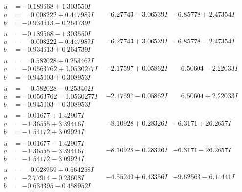 \documentclass[1p]{elsarticle_modified}
\theoremstyle{definition}
\begin{document}
$$\begin{array}{c|c|c}
\begin{aligned}
u &= -0.189668 + 1.303550 I \\
a &= \phantom{-}0.008222 + 0.447989 I \\
b &= -0.934613 - 0.264739 I\end{aligned}
 & -6.27743 - 3.06539 I & -6.85778 + 2.47354 I \\ \hline\begin{aligned}
u &= -0.189668 - 1.303550 I \\
a &= \phantom{-}0.008222 - 0.447989 I \\
b &= -0.934613 + 0.264739 I\end{aligned}
 & -6.27743 + 3.06539 I & -6.85778 - 2.47354 I \\ \hline\begin{aligned}
u &= \phantom{-}0.582028 + 0.253462 I \\
a &= -0.0563762 + 0.0530277 I \\
b &= -0.945003 + 0.308953 I\end{aligned}
 & -2.17597 + 0.05862 I & \phantom{-}6.50604 - 2.22033 I \\ \hline\begin{aligned}
u &= \phantom{-}0.582028 - 0.253462 I \\
a &= -0.0563762 - 0.0530277 I \\
b &= -0.945003 - 0.308953 I\end{aligned}
 & -2.17597 - 0.05862 I & \phantom{-}6.50604 + 2.22033 I \\ \hline\begin{aligned}
u &= -0.01677 + 1.42907 I \\
a &= -1.36555 + 3.39416 I \\
b &= -1.54172 + 3.09921 I\end{aligned}
 & -8.10928 + 0.28326 I & -6.3171 + 26.2657 I \\ \hline\begin{aligned}
u &= -0.01677 - 1.42907 I \\
a &= -1.36555 - 3.39416 I \\
b &= -1.54172 - 3.09921 I\end{aligned}
 & -8.10928 - 0.28326 I & -6.3171 - 26.2657 I \\ \hline\begin{aligned}
u &= \phantom{-}0.028959 + 0.564258 I \\
a &= -2.77914 - 0.23608 I \\
b &= -0.634395 - 0.458952 I\end{aligned}
 & -4.55240 + 6.43356 I & -9.62563 - 6.14441 I \\ \hline\begin{aligned}

\end{aligned}
\end{array}$$
\end{document}
